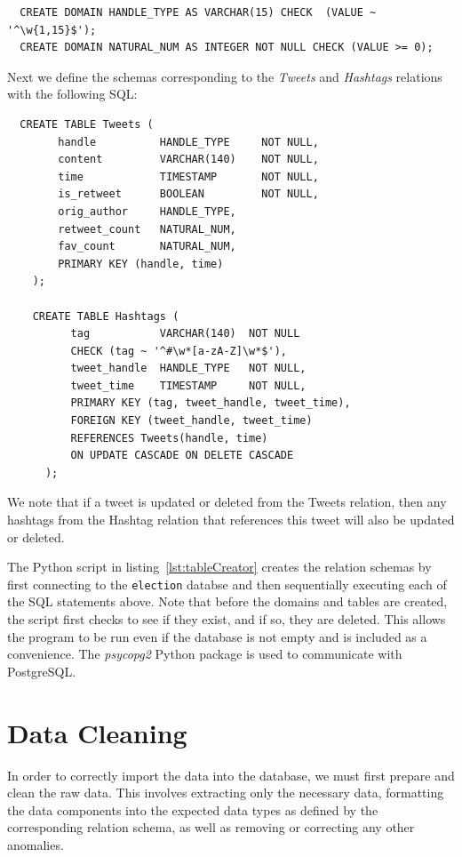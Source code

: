 \documentclass[a4paper, 12pt]{report}
\begin{document}
\begin{verbatim}
  CREATE DOMAIN HANDLE_TYPE AS VARCHAR(15) CHECK  (VALUE ~ '^\w{1,15}$');
  CREATE DOMAIN NATURAL_NUM AS INTEGER NOT NULL CHECK (VALUE >= 0);
\end{verbatim}

Next we define the schemas corresponding to the \textit{Tweets} and \textit{Hashtags} relations with the following SQL:

\begin{verbatim}
  CREATE TABLE Tweets (
        handle          HANDLE_TYPE     NOT NULL,
        content         VARCHAR(140)    NOT NULL,
        time            TIMESTAMP       NOT NULL,
        is_retweet      BOOLEAN         NOT NULL,
        orig_author     HANDLE_TYPE,
        retweet_count   NATURAL_NUM,
        fav_count       NATURAL_NUM,
        PRIMARY KEY (handle, time)
    );

    CREATE TABLE Hashtags (
          tag           VARCHAR(140)  NOT NULL
          CHECK (tag ~ '^#\w*[a-zA-Z]\w*$'),
          tweet_handle  HANDLE_TYPE   NOT NULL,
          tweet_time    TIMESTAMP     NOT NULL,
          PRIMARY KEY (tag, tweet_handle, tweet_time),
          FOREIGN KEY (tweet_handle, tweet_time)
          REFERENCES Tweets(handle, time)
          ON UPDATE CASCADE ON DELETE CASCADE
      );
\end{verbatim}

We note that if a tweet is updated or deleted from the Tweets relation, then any hashtags from the Hashtag relation that references this tweet will also be updated or deleted.

The Python script in listing~\ref{lst:tableCreator} creates the relation schemas by first connecting to the \texttt{election} databse and then sequentially executing each of the SQL statements above. Note that before the domains and tables are created, the script first checks to see if they exist, and if so, they are deleted. This allows the program to be run even if the database is not empty and is included as a convenience. The \textit{psycopg2} Python package is used to communicate with PostgreSQL.


\label{lst:tableCreator}

\newpage
\section{Data Cleaning}
\label{sec:dataCleaning}
In order to correctly import the data into the database, we must first prepare and clean the raw data. This involves extracting only the necessary data, formatting the data components into the expected data types as defined by the corresponding relation schema, as well as removing or correcting any other anomalies.
\end{document}
